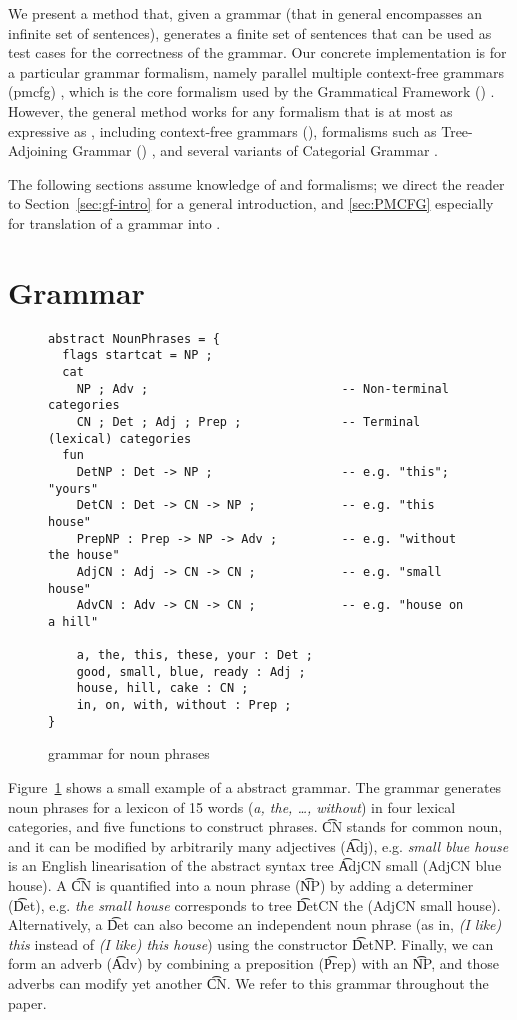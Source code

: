 We present a method that, given a grammar (that in general encompasses
an infinite set of sentences), generates a finite set of sentences
that can be used as test cases for the correctness of the grammar. Our
concrete implementation is for a particular grammar formalism,
namely parallel multiple context-free grammars ({\sc pmcfg})
\cite{seki91pmcfg}, which is the core formalism used by the
Grammatical Framework (\gf) \cite{ranta2004gf}. However, the general
method works for any formalism that is at most as expressive as
\pmcfg{}, including context-free grammars (\cfg), formalisms such as Tree-Adjoining Grammar (\tag)
\cite{joshi1975tag}, and several variants of Categorial Grammar
\cite{deGroote2004,steedman1988ccg}.

The following sections assume knowledge of \gf{} and \pmcfg{}
formalisms; we direct the reader to Section~\ref{sec:gf-intro} for a
general \gf{} introduction, and \ref{sec:PMCFG} especially for
translation of a \gf{} grammar into \pmcfg{}.

\section{Grammar}


\begin{figure}[h]
  \centering
\begin{verbatim}
abstract NounPhrases = {
  flags startcat = NP ;
  cat
    NP ; Adv ;                           -- Non-terminal categories
    CN ; Det ; Adj ; Prep ;              -- Terminal (lexical) categories
  fun
    DetNP : Det -> NP ;                  -- e.g. "this"; "yours"
    DetCN : Det -> CN -> NP ;            -- e.g. "this house"
    PrepNP : Prep -> NP -> Adv ;         -- e.g. "without the house"
    AdjCN : Adj -> CN -> CN ;            -- e.g. "small house"
    AdvCN : Adv -> CN -> CN ;            -- e.g. "house on a hill"

    a, the, this, these, your : Det ;
    good, small, blue, ready : Adj ;
    house, hill, cake : CN ;
    in, on, with, without : Prep ; 
}
\end{verbatim}
  \caption{\gf{} grammar for noun phrases}
\label{fig:exampleGrammar}
\end{figure}

Figure~\ref{fig:exampleGrammar} shows a small example of a \gf{} abstract
grammar. The grammar generates noun phrases for a lexicon of 15
words (\emph{a, the, \dots, without}) in four lexical categories,
and five functions to construct phrases. \t{CN} stands for common
noun, and it can be modified by arbitrarily many adjectives (\t{Adj}),
e.g. \emph{small blue house} is an English linearisation of the
abstract syntax tree \t{AdjCN small (AdjCN blue house)}. A \t{CN} is
quantified into a noun phrase (\t{NP}) by adding a determiner
(\t{Det}), e.g. \emph{the small house} corresponds to tree \t{DetCN the (AdjCN small
  house)}. Alternatively, a \t{Det} can also become an independent
noun phrase (as in, \emph{(I like) this} instead of \emph{(I like) this
  house}) using the constructor \t{DetNP}. Finally, we can form an
adverb (\t{Adv}) by combining a preposition (\t{Prep}) with an \t{NP},
and those adverbs can modify yet another \t{CN}. 
We refer to this grammar throughout the paper.

